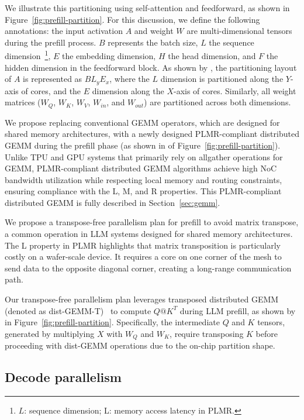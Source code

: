 We illustrate this partitioning using self-attention and feedforward, as shown in Figure~\ref{fig:prefill-partition}. For this discussion, we define the following annotations: the input activation $A$ and weight $W$ are multi-dimensional tensors during the prefill process. $B$ represents the batch size, $L$ the sequence dimension~\footnote{$L$: sequence dimension; L: memory access latency in PLMR.}, $E$ the embedding dimension, $H$ the head dimension, and $F$ the hidden dimension in the feedforward block.
As shown by , the partitioning layout of $A$ is represented as $BL_yE_x$, where the $L$ dimension is partitioned along the $Y$-axis of cores, and the $E$ dimension along the $X$-axis of cores. Similarly, all weight matrices ($W_Q$, $W_K$, $W_V$, $W_{in}$, and $W_{out}$) are partitioned across both dimensions. 


We propose replacing conventional GEMM operators, which are designed for shared memory architectures, with a newly designed PLMR-compliant distributed GEMM during the prefill phase (as shown in  of Figure~\ref{fig:prefill-partition}). Unlike TPU and GPU systems that primarily rely on allgather operations for GEMM, PLMR-compliant distributed GEMM algorithms achieve high NoC bandwidth utilization while respecting local memory and routing constraints, ensuring compliance with the L, M, and R properties. This PLMR-compliant distributed GEMM is fully described in Section~\ref{sec:gemm}.

We propose a transpose-free parallelism plan for prefill to avoid matrix transpose, a common operation in LLM systems designed for shared memory architectures. The L property in PLMR highlights that matrix transposition is particularly costly on a wafer-scale device. It requires a core on one corner of the mesh to send data to the opposite diagonal corner, creating a long-range communication path.

Our transpose-free parallelism plan leverages transposed distributed GEMM (denoted as dist-GEMM-T)~\cite{summa, trans-dist} to compute $Q@K^T$ during LLM prefill, as shown by  in Figure~\ref{fig:prefill-partition}. Specifically, the intermediate $Q$ and $K$ tensors, generated by multiplying $X$ with $W_Q$ and $W_K$, require transposing $K$ before proceeding with dist-GEMM operations due to the on-chip partition shape.

    \vspace{-3mm}
\subsection{Decode parallelism}
    \vspace{-1mm}

